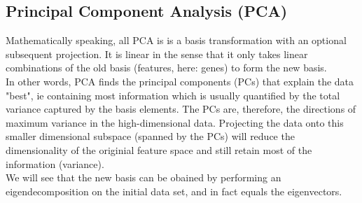 \documentclass[journal, a4paper]{IEEEtran}
\begin{document}

\subsection{Principal Component Analysis (PCA)}

Mathematically speaking, all PCA is is a basis transformation with an optional subsequent projection. It is linear in the sense that it only takes linear combinations of the old basis (features, here: genes) to form the new basis. \\

In other words, PCA finds the principal components (PCs) that explain the data "best", ie containing most information which is usually quantified by the total variance captured by the basis elements. The PCs are, therefore, the directions of maximum variance in the high-dimensional data. Projecting the data onto this smaller dimensional subspace (spanned by the PCs) will reduce the dimensionality of the originial feature space and still retain most of the information (variance). \\
We will see that the new basis can be obained by performing an eigendecomposition on the initial data set, and in fact equals the eigenvectors.




\end{document}
